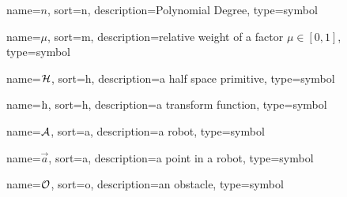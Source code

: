 	{%
		name=\ensuremath{n},
		sort=n,
		description=Polynomial Degree,
		type=symbol
	}
	\newcommand{\poldeg}{\gls{sym:poldeg}}

	{%
		name=\ensuremath{\mu},
		sort=m,
		description=relative weight of a factor \ensuremath{\mu \in [0, 1]},
		type=symbol
	}
	\newcommand{\relweight}{\gls{sym:relweight}}

	{%
		name=\ensuremath{\set{H}},
		sort=h,
		description=a half space primitive,
		type=symbol
	}
	\newcommand{\halfspaceprimitive}{\gls{sym:halfspaceprimitive}}

	{%
		name=\ensuremath{\func{h}},
		sort=h,
		description=a transform function,
		type=symbol
	}
	\newcommand{\transform}{\gls{sym:transform}}

	{%
		name=\ensuremath{\set{A}},
		sort=a,
		description=a robot,
		type=symbol
	}
	\newcommand{\robot}{\gls{sym:robot}}

	{%
		name=\ensuremath{\vec{a}},
		sort=a,
		description=a point in a robot,
		type=symbol
	}
	\newcommand{\pointinrobot}{\gls{sym:pointinrobot}}

	{%
		name=\ensuremath{\set{O}},
		sort=o,
		description=an obstacle,
		type=symbol
	}
	\newcommand{\obstacle}{\gls{sym:obstacle}}

